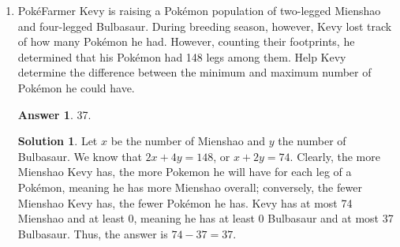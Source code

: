 \documentclass[11pt]{article}
\theoremstyle{definition}
\newtheorem*{solution}{Solution}
\newtheorem*{answer}{Answer}
\begin{document}
\begin{enumerate}
\item Pok\'{e}Farmer Kevy is raising a Pok\'{e}mon population of two-legged Mienshao and four-legged Bulbasaur. During breeding season, however, Kevy lost track of how many Pok\'{e}mon he had. However, counting their footprints, he determined that his Pok\'{e}mon had 148 legs among them. Help Kevy determine the difference between the minimum and maximum number of Pok\'{e}mon he could have.

\begin{answer}
37.
\end{answer}
\begin{solution} Let $x$ be the number of Mienshao and $y$ the number of Bulbasaur. We know that $2x + 4y = 148$, or $x + 2y = 74$. Clearly, the more Mienshao Kevy has, the more Pokemon he will have for each leg of a Pok\'{e}mon, meaning he has more Mienshao overall; conversely, the fewer Mienshao Kevy has, the fewer Pok\'{e}mon he has. Kevy has at most 74 Mienshao and at least 0, meaning he has at least 0 Bulbasaur and at most 37 Bulbasaur. Thus, the answer is $74 - 37 = \boxed{37}$.
\end{solution}

\end{enumerate}
\end{document}
